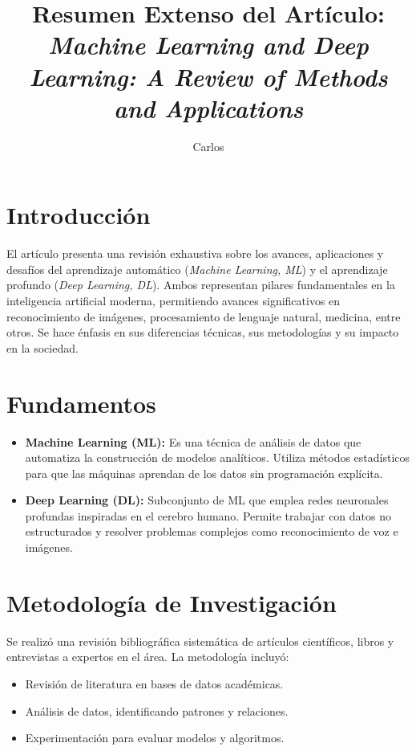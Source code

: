 \documentclass[12pt]{article}
\title{Resumen Extenso del Art\'iculo: \emph{Machine Learning and Deep Learning: A Review of Methods and Applications}}
\author{Carlos}
\date{}
\begin{document}
\maketitle

\section*{Introducci\'on}
El art\'iculo presenta una revisi\'on exhaustiva sobre los avances, aplicaciones y desaf\'ios del aprendizaje autom\'atico (\emph{Machine Learning, ML}) y el aprendizaje profundo (\emph{Deep Learning, DL}). Ambos representan pilares fundamentales en la inteligencia artificial moderna, permitiendo avances significativos en reconocimiento de im\'agenes, procesamiento de lenguaje natural, medicina, entre otros. Se hace \'enfasis en sus diferencias t\'ecnicas, sus metodolog\'ias y su impacto en la sociedad.

\section*{Fundamentos}
\begin{itemize}
    \item \textbf{Machine Learning (ML):} Es una t\'ecnica de an\'alisis de datos que automatiza la construcci\'on de modelos anal\'iticos. Utiliza m\'etodos estad\'isticos para que las m\'aquinas aprendan de los datos sin programaci\'on expl\'icita.
    \item \textbf{Deep Learning (DL):} Subconjunto de ML que emplea redes neuronales profundas inspiradas en el cerebro humano. Permite trabajar con datos no estructurados y resolver problemas complejos como reconocimiento de voz e im\'agenes.
\end{itemize}

\section*{Metodolog\'ia de Investigaci\'on}
Se realiz\'o una revisi\'on bibliogr\'afica sistem\'atica de art\'iculos cient\'ificos, libros y entrevistas a expertos en el \'area. La metodolog\'ia incluy\'o:
\begin{itemize}
    \item Revisi\'on de literatura en bases de datos acad\'emicas.
    \item An\'alisis de datos, identificando patrones y relaciones.
    \item Experimentaci\'on para evaluar modelos y algoritmos.
\end{itemize}
\end{document}
